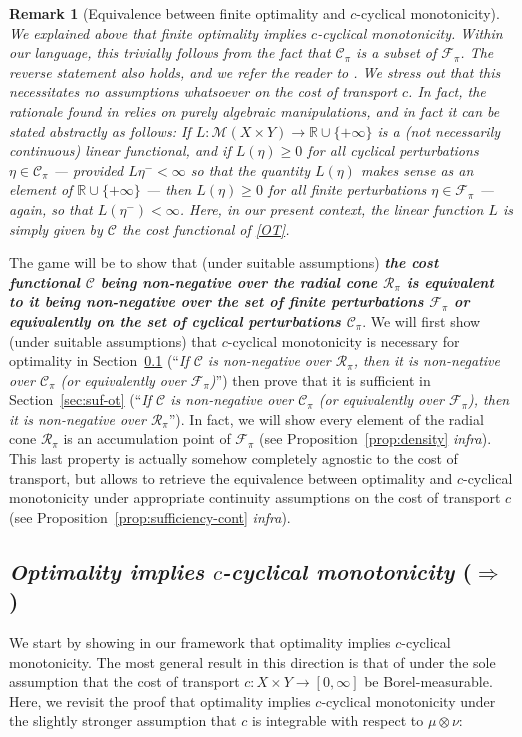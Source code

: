 \documentclass[leqno, 11pt, a4paper]{amsart}
\newtheorem{rem}{Remark}
\theoremstyle{definition}
\newcommand{\cR}{\mathcal{R}}
\newcommand{\cC}{\mathcal{C}}
\newcommand{\R}{\mathbb{R}}
\newcommand{\C}{\mathscr{C}}
\newcommand{\cF}{\mathcal{F}}
\newcommand{\cM}{\mathcal{M}}
\newcommand{\extendedR}{\R \cup \{+\infty\}}
\begin{document}
\begin{rem}[Equivalence between finite optimality and $c$-cyclical monotonicity]\label{rem:equiv-fin-opt-c-cm}
    We explained above that \emph{finite optimality} implies $c$-cyclical monotonicity. Within our language, this trivially follows from the fact that $\cC_\pi$ is a subset of $\cF_\pi$. The reverse statement also holds, and we refer the reader to \cite[Appendix D]{depascale60YearsCyclic2025}. We stress out that this necessitates no assumptions whatsoever on the cost of transport $c$. In fact, the rationale found in \cite{depascale60YearsCyclic2025} relies on purely algebraic manipulations, and in fact it can be stated abstractly as follows: \emph{If $L : \cM(X \times Y) \to \extendedR$ is a (not necessarily continuous) linear functional, and if $L(\eta) \geq 0$ for all cyclical perturbations $\eta \in \cC_\pi$} --- provided $L\eta^- < \infty$ so that the quantity $L(\eta)$ makes sense as an element of $\R \cup \{+\infty\}$ --- \emph{then $L(\eta) \geq 0$ for all finite perturbations $\eta \in \cF_\pi$} --- again, so that $L(\eta^-) < \infty$. Here, in our present context, the linear function $L$ is simply given by $\C$ the cost functional of \eqref{OT}.
\end{rem}


The game will be to show that (under suitable assumptions) \textbf{\textit{the cost functional $\C$ being non-negative over the radial cone $\cR_\pi$ is equivalent to it being non-negative over the set of finite perturbations $\cF_\pi$ or equivalently on the set of cyclical perturbations $\cC_\pi$}}. We will first show (under suitable assumptions) that $c$-cyclical monotonicity is necessary for optimality in Section~\ref{sec:nec-ot} (``\textit{If $\C$ is non-negative over $\cR_\pi$, then it is non-negative over $\cC_\pi$ (or equivalently over $\cF_\pi$)}'') then prove that it is sufficient in Section~\ref{sec:suf-ot} (``\textit{If $\C$ is non-negative over $\cC_\pi$ (or equivalently over $\cF_\pi$), then it is non-negative over $\cR_\pi$}''). In fact, we will show every element of the radial cone $\cR_\pi$ is an accumulation point of $\cF_\pi$ (see Proposition~\ref{prop:density} \textit{infra}). This last property is actually somehow completely agnostic to the cost of transport, but allows to retrieve the equivalence between optimality and $c$-cyclical monotonicity under appropriate continuity assumptions on the cost of transport $c$ (see Proposition~\ref{prop:sufficiency-cont} \textit{infra}). 


\subsection{\textit{Optimality implies $c$-cyclical monotonicity} ($\Rightarrow$)}\label{sec:nec-ot}
We start by showing in our framework that optimality implies $c$-cyclical monotonicity. The most general result in this direction is that of \textcite{beiglbockOptimalBetterTransport2009} under the sole assumption that the cost of transport $c : X \times Y \to [0, \infty]$ be Borel-measurable. Here, we revisit the proof that optimality implies $c$-cyclical monotonicity under the slightly stronger assumption that $c$ is integrable with respect to $\mu \otimes \nu$:
\end{document}
